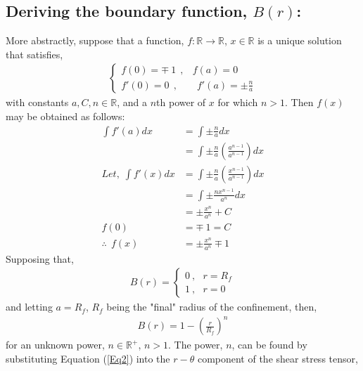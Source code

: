 \documentclass{article}
\begin{document}
\subsection{Deriving the boundary function, $B(r)$:}
More abstractly, suppose that a function, $f: \mathbb{R}\to \mathbb{R}$, $x\in \mathbb{R}$ is a unique solution that satisfies,
\begin{align*}
    \left\{\begin{matrix}
    f(0)= \mp \: 1 \:\:,& f(a)=0 \\ f'(0)=0 \:\:,& \:\:f'(a)=\pm \frac{n}{a}
    \end{matrix}\right.
\end{align*}
with constants $a,C,n\in \mathbb{R}$, and a $n$th power of $x$ for which $n>1$. Then $f(x)$ may be obtained as follows:
\begin{align*}
    \int f'(a)dx &= \int \pm \frac{n}{a}dx \\
    &= \int \pm \frac{n}{a} \left( \frac{a^{n-1}}{a^{n-1}}\right) dx \\
    \textit{Let,} \:\: \int f'(x)dx &= \int \pm \frac{n}{a} \left( \frac{x^{n-1}}{a^{n-1}}\right) dx \\
    &= \int \pm \frac{nx^{n-1}}{a^n}dx \\
    &= \pm \frac{x^{n}}{a^n}+C  \\ 
    f(0) &= \mp \: 1 = C \\
    \therefore \:\: f(x) &= \pm \frac{x^n}{a^n} \mp 1
\end{align*}
Supposing that,
\begin{align*}
    B(r)=\left\{\begin{matrix} 0\:,\:\:\:r=R_f \\ 1\:,\:\:\:r=0 \end{matrix}\right.
\end{align*}
and letting $a=R_f$, $R_f$ being the "final" radius of the confinement, then,
\begin{align}\label{Eq3}
    B(r)=1-\left( \frac{r}{R_f}\right)^n
\end{align}
for an unknown power, $n\in \mathbb{R}^+$, $n>1$. The power, $n$, can be found by substituting Equation (\ref{Eq2}) into the $r-\theta$ component of the shear stress tensor,
\end{document}
